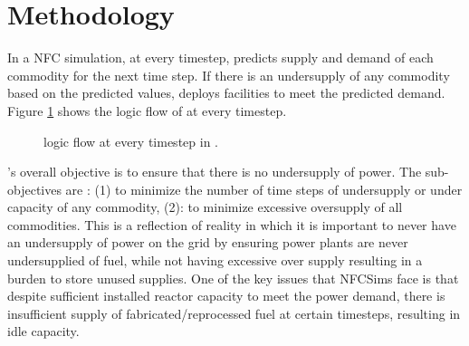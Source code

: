 \section{Methodology}
In a \Cyclus \gls{NFC} simulation, at every timestep, \deploy 
predicts supply and demand of each commodity for the next time 
step. 
If there is an undersupply of any commodity based 
on the predicted values, \deploy deploys facilities to meet 
the predicted demand.  
Figure \ref{fig:flow} shows the logic flow of \deploy 
at every timestep. 

\begin{figure}[H]
	\centering
    \label{fig:flow}
    \caption{\Deploy logic flow at every timestep in \Cyclus \cite{chee_demonstration_2019}.}
\end{figure}

\Deploy's overall objective is to ensure that there is no 
undersupply of power. 
The sub-objectives are : (1) to minimize the number of time 
steps of undersupply or under capacity of any 
commodity, (2): to minimize excessive oversupply of all commodities.
This is a reflection of reality in which it is important to 
never have an undersupply of power on the grid by ensuring power 
plants are never undersupplied of fuel, while not 
having excessive over supply resulting in a burden to store unused 
supplies. 
One of the key issues that \gls{NFCSim}s face is that despite
sufficient installed reactor capacity to meet the power 
demand, there is insufficient supply of fabricated/reprocessed 
fuel at certain timesteps, resulting in idle capacity.  

